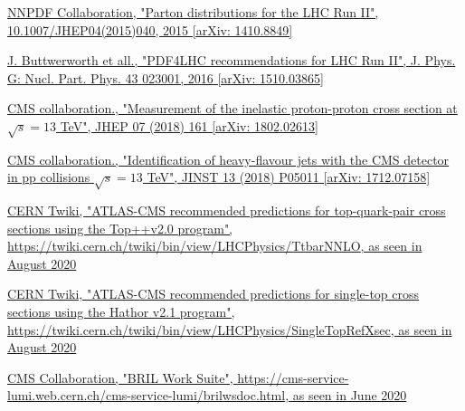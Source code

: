 \documentclass[a4paper, 10pt, openright]{report}
\begin{document}
\begin{thebibliography}{1}
\href{https://arxiv.org/abs/1410.8849}{NNPDF Collaboration,
"Parton distributions for the LHC Run II", 10.1007/JHEP04(2015)040, 2015 [arXiv: 1410.8849]}

\href{https://arxiv.org/abs/1510.03865}{J. Buttwerworth et all.,
"PDF4LHC recommendations for LHC Run II", J. Phys. G: Nucl. Part. Phys. 43 023001, 2016 [arXiv: 1510.03865]}

\href{https://arxiv.org/abs/1802.02613}{CMS collaboration.,
"Measurement of the inelastic proton-proton cross section at $\sqrt{s} = 13$ TeV", 	JHEP 07 (2018) 161 [arXiv: 1802.02613]}

\href{https://arxiv.org/abs/1712.07158}{CMS collaboration.,
"Identification of heavy-flavour jets with the CMS detector in pp collisions $\sqrt{s} = 13$ TeV", 		JINST 13 (2018) P05011 [arXiv: 1712.07158]}

\href{https://twiki.cern.ch/twiki/bin/view/LHCPhysics/TtbarNNLO}{CERN Twiki,
"ATLAS-CMS recommended predictions for top-quark-pair cross sections using the Top++v2.0 program", \url{https://twiki.cern.ch/twiki/bin/view/LHCPhysics/TtbarNNLO}, as seen in August 2020}

\href{https://twiki.cern.ch/twiki/bin/view/LHCPhysics/SingleTopRefXsec}{CERN Twiki, 
"ATLAS-CMS recommended predictions for single-top cross sections using the Hathor v2.1 program",
\url{https://twiki.cern.ch/twiki/bin/view/LHCPhysics/SingleTopRefXsec}, as seen in August 2020}


\href{https://cms-service-lumi.web.cern.ch/cms-service-lumi/brilwsdoc.html}{CMS Collaboration,
"BRIL Work Suite", \url{https://cms-service-lumi.web.cern.ch/cms-service-lumi/brilwsdoc.html}, as seen in June 2020}

\end{thebibliography}
\end{document}
